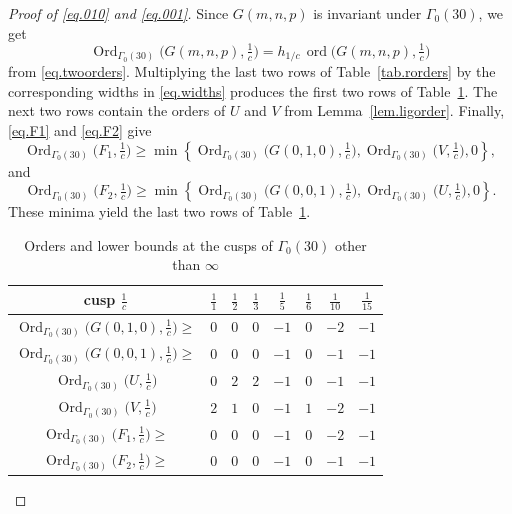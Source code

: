 \documentclass{amsart}
\theoremstyle{definition}
\DeclareMathOperator{\ord}{ord}
\DeclareMathOperator{\Ord}{Ord}
\begin{document}
{{\begin{proof}[Proof of \eqref{eq.010} and \eqref{eq.001}]
Since $G(m,n,p)$ is invariant under $\Gamma_{0}(30)$, we get
\begin{equation*}
\Ord_{\Gamma_{0}(30)}\bigl(G(m,n,p),\tfrac1c\bigr)
=h_{1/c}\,\ord\bigl(G(m,n,p),\tfrac1c\bigr)
\end{equation*}
from \eqref{eq.twoorders}. Multiplying the last two rows of Table~\ref{tab.rorders} by the
corresponding widths in \eqref{eq.widths} produces the first two rows of
Table~\ref{tab.Gorders}. The next two rows contain the orders of $U$
and $V$ from Lemma~\ref{lem.ligorder}.
Finally, \eqref{eq.F1} and
\eqref{eq.F2} give
\begin{equation*}
\Ord_{\Gamma_{0}(30)}
\bigl(F_{1},\tfrac1c\bigr)
\geq
\min\!\left\{
\Ord_{\Gamma_{0}(30)}
\bigl(G(0,1,0),\tfrac1c\bigr),
\Ord_{\Gamma_{0}(30)}
\bigl(V,\tfrac1c\bigr),
0
\right\},
\end{equation*}
and
\begin{equation*}
\Ord_{\Gamma_{0}(30)}
\bigl(F_{2},\tfrac1c\bigr)
\geq
\min\!\left\{
\Ord_{\Gamma_{0}(30)}
\bigl(G(0,0,1),\tfrac1c\bigr),
\Ord_{\Gamma_{0}(30)}
\bigl(U,\tfrac1c\bigr),
0
\right\}.
\end{equation*}
These minima yield the last two rows of Table~\ref{tab.Gorders}.


\begin{table}[H]
\centering
\renewcommand{\arraystretch}{1.25}
\begin{tabular}{|c||c|c|c|c|c|c|c|}
\hline
cusp $\tfrac1c$ & $\tfrac11$ & $\tfrac12$ & $\tfrac13$ & $\tfrac15$
& $\tfrac16$ & $\tfrac1{10}$ & $\tfrac1{15}$\\
\hline
$\Ord_{\Gamma_{0}(30)}\bigl(G(0,1,0),\tfrac1c\bigr)\ge$
& $0$ & $0$ & $0$ & $-1$ & $0$ & $-2$ & $-1$\\
$\Ord_{\Gamma_{0}(30)}\bigl(G(0,0,1),\tfrac1c\bigr)\ge$
& $0$ & $0$ & $0$ & $-1$ & $0$ & $-1$ & $-1$\\
\hline
$\Ord_{\Gamma_{0}(30)}\bigl(U,\tfrac1c\bigr)$ & $0$ & $2$ & $2$ & $-1$ & $0$ & $-1$ & $-1$\\
$\Ord_{\Gamma_{0}(30)}\bigl(V,\tfrac1c\bigr)$ & $2$ & $1$ & $0$ & $-1$ & $1$ & $-2$ & $-1$\\
\hline
$\Ord_{\Gamma_{0}(30)}\bigl(F_{1},\tfrac1c\bigr)\ge$ & $0$ & $0$ & $0$ & $-1$ & $0$ & $-2$ & $-1$\\
$\Ord_{\Gamma_{0}(30)}\bigl(F_{2},\tfrac1c\bigr)\ge$ & $0$ & $0$ & $0$ & $-1$ & $0$ & $-1$ & $-1$\\
\hline
\end{tabular}
\caption{Orders and lower bounds at the cusps of $\Gamma_0(30)$ other than $\infty$}
\label{tab.Gorders}
\end{table}


\end{proof}}}
\end{document}
